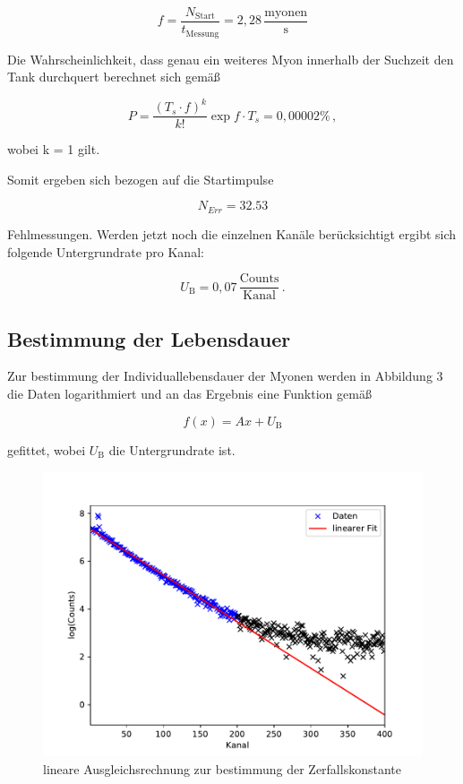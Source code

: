 \begin{equation}
f = \frac{N_{\text{Start}}}{t_{\text{Messung}}} = 2,28 \, \frac{\text{myonen}}{\text{s}}
\end{equation}

\noindent Die Wahrscheinlichkeit, dass genau ein weiteres Myon innerhalb der Suchzeit den Tank durchquert berechnet sich gemäß

\begin{equation}
P = \frac{(T_s \cdot f)^k}{k!} \exp{f \cdot T_s} = 0,00002 \%\,,
\end{equation}


\noindent wobei k = 1 gilt.

\noindent Somit ergeben sich bezogen auf die Startimpulse

\begin{equation}
N_{Err} = 32.53
\end{equation}

\noindent Fehlmessungen. Werden jetzt noch die einzelnen Kanäle berücksichtigt ergibt sich folgende Untergrundrate pro Kanal:

\begin{equation}
U_{\text{B}} = 0,07 \, \frac{\text{Counts}}{\text{Kanal}}\,.
\end{equation}

\subsection{Bestimmung der Lebensdauer}
\label{subsec:lifetime}
Zur bestimmung der Individuallebensdauer der Myonen werden in Abbildung 3 die Daten logarithmiert und an das Ergebnis eine Funktion gemäß

\begin{equation}
f(x) = Ax + U_{\text{B}}
\end{equation}

\noindent gefittet, wobei $U_{\text{B}}$ die Untergrundrate ist.

\begin{figure}[h!]
	\centering
	\includegraphics[width=\textwidth]{img/myons.pdf}
	\caption{lineare Ausgleichsrechnung zur bestimmung der Zerfallskonstante}
	\label{abb:fit}
\end{figure}

